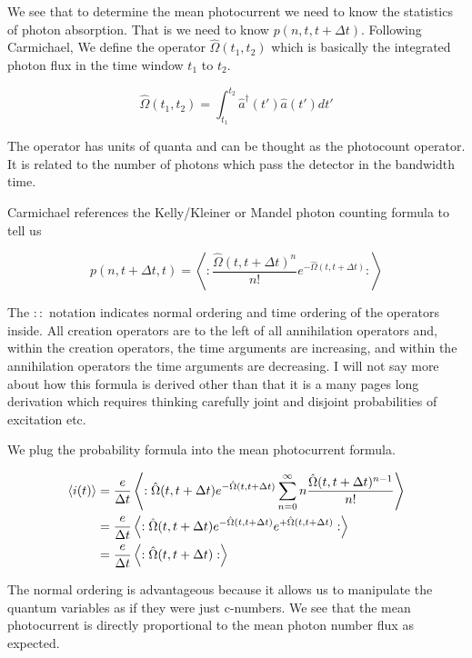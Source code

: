 \documentclass[12pt]{article}
\begin{document}
We see that to determine the mean photocurrent we need to know the statistics of photon absorption. That is we need to know $p(n,t,t+\Delta t)$. Following Carmichael, We define the operator $\hat{\Omega}(t_1,t_2)$ which is basically the integrated photon flux in the time window $t_1$ to $t_2$.

\begin{equation}
\hat{\Omega}(t_1,t_2) = \int_{t_1}^{t_2} \hat{a}^{\dag}(t') \hat{a}(t') dt'
\end{equation}

The operator has units of quanta and can be thought as the photocount operator. It is related to the number of photons which pass the detector in the bandwidth time.

Carmichael references the Kelly/Kleiner or Mandel photon counting formula to tell us


\begin{equation}
p(n,t+\Delta t,t) = \left< :\frac{\hat{\Omega}(t,t+\Delta t)^n}{n!}e^{-\hat{\Omega}(t,t+\Delta t)}:\right>
\end{equation}

The $::$ notation indicates normal ordering and time ordering of the operators inside. All creation operators are to the left of all annihilation operators and, within the creation operators, the time arguments are increasing, and within the annihilation operators the time arguments are decreasing. I will not say more about how this formula is derived other than that it is a many pages long derivation which requires thinking carefully joint and disjoint probabilities of excitation etc.

We plug the probability formula into the mean photocurrent formula.

\begin{align}
\braket{i(t)} &= \frac{e}{\Delta t} \left<: \hat{\Omega}(t,t+\Delta t) e^{-\hat{\Omega}(t,t+\Delta t)}\sum_{n=0}^{\infty} n \frac{\hat{\Omega}(t,t+\Delta t)^{n-1}}{n!} \right>\\
&= \frac{e}{\Delta t} \left<:\hat{\Omega}(t,t+\Delta t) e^{-\hat{\Omega}(t,t+\Delta t)} e^{+\hat{\Omega}(t,t+\Delta t)}:\right>\\
&= \frac{e}{\Delta t}\left<:\hat{\Omega}(t,t+\Delta t):\right>
\end{align}

The normal ordering is advantageous because it allows us to manipulate the quantum variables as if they were just c-numbers. We see that the mean photocurrent is directly proportional to the mean photon number flux as expected. 
\end{document}
